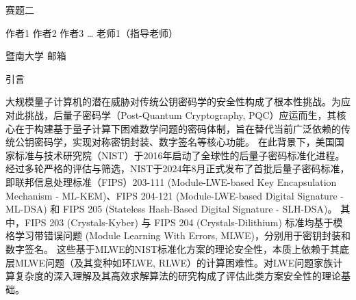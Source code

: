 \documentclass[12pt,a4paper]{article}
\newcommand{\fs}{\CJKfamily{fs}}
\numberwithin{equation}{section}
\begin{document}
\begin{center}
	{\heiti\fontsize{16pt}{24pt}\selectfont 赛题二}
\end{center}

\begin{center}
	{\fs\fontsize{12pt}{18pt}\selectfont 作者1 作者2 作者3 … 老师1（指导老师）}
\end{center}

\begin{center}
	{\songti\fontsize{10.5pt}{15.75pt}\selectfont 暨南大学 \; 邮箱}
\end{center}

\vspace{1em}


\vspace{1em}


\vspace{2em}

{\centering\heiti\fontsize{16pt}{24pt}\selectfont 引言\par}
\vspace{1em}

大规模量子计算机的潜在威胁对传统公钥密码学的安全性构成了根本性挑战。为应对此挑战，后量子密码学（Post-Quantum Cryptography, PQC）应运而生，其核心在于构建基于量子计算下困难数学问题的密码体制，旨在替代当前广泛依赖的传统公钥密码学，实现对称密钥封装、数字签名等核心功能。
在此背景下，美国国家标准与技术研究院（NIST）于2016年启动了全球性的后量子密码标准化进程。经过多轮严格的评估与筛选，NIST于2024年8月正式发布了首批后量子密码标准，即联邦信息处理标准（FIPS）203-111 (Module-LWE-based Key Encapsulation Mechanism - ML-KEM)、FIPS 204-121 (Module-LWE-based Digital Signature - ML-DSA) 和 FIPS 205 (Stateless Hash-Based Digital Signature - SLH-DSA)。
其中，FIPS 203 (Crystals-Kyber) 与 FIPS 204 (Crystals-Dilithium) 标准均基于模格学习带错误问题 (Module Learning With Errors, MLWE)，分别用于密钥封装和数字签名。
这些基于MLWE的NIST标准化方案的理论安全性，本质上依赖于其底层MLWE问题（及其变种如环LWE, RLWE）的计算困难性。对LWE问题家族计算复杂度的深入理解及其高效求解算法的研究构成了评估此类方案安全性的理论基础。
\end{document}
